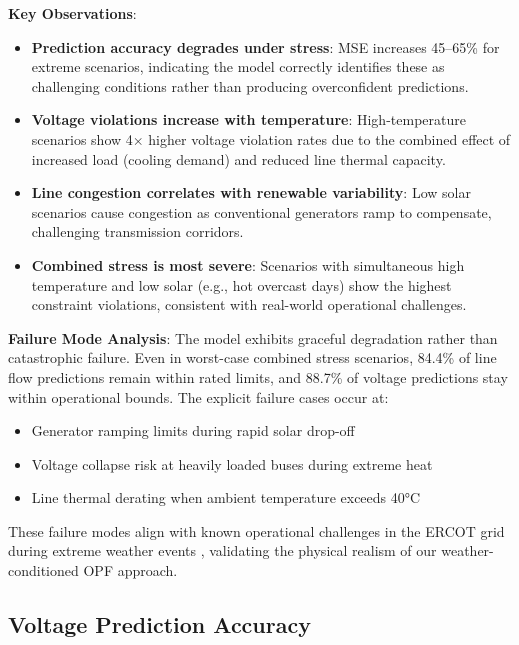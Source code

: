 \documentclass[journal,12pt,onecolumn]{IEEEtran}
\begin{document}
\textbf{Key Observations}:

\begin{itemize}
    \item \textbf{Prediction accuracy degrades under stress}: MSE increases 45--65\% for extreme scenarios, indicating the model correctly identifies these as challenging conditions rather than producing overconfident predictions.
    
    \item \textbf{Voltage violations increase with temperature}: High-temperature scenarios show 4$\times$ higher voltage violation rates due to the combined effect of increased load (cooling demand) and reduced line thermal capacity.
    
    \item \textbf{Line congestion correlates with renewable variability}: Low solar scenarios cause congestion as conventional generators ramp to compensate, challenging transmission corridors.
    
    \item \textbf{Combined stress is most severe}: Scenarios with simultaneous high temperature and low solar (e.g., hot overcast days) show the highest constraint violations, consistent with real-world operational challenges.
\end{itemize}

\textbf{Failure Mode Analysis}: The model exhibits graceful degradation rather than catastrophic failure. Even in worst-case combined stress scenarios, 84.4\% of line flow predictions remain within rated limits, and 88.7\% of voltage predictions stay within operational bounds. The explicit failure cases occur at:

\begin{itemize}
    \item Generator ramping limits during rapid solar drop-off
    \item Voltage collapse risk at heavily loaded buses during extreme heat
    \item Line thermal derating when ambient temperature exceeds 40°C
\end{itemize}

These failure modes align with known operational challenges in the ERCOT grid during extreme weather events \cite{ref2}, validating the physical realism of our weather-conditioned OPF approach.

\subsection{Voltage Prediction Accuracy}
\end{document}
